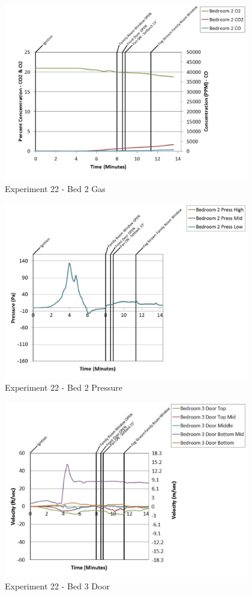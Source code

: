 \documentclass{article}
\begin{document}
\begin{appendices}
	\begin{figure}[h!]
		\centering
		\includegraphics[height=3.05in]{0_Images/Results_Charts/Exp_22_Charts/Bed2Gas.pdf}
		\caption{Experiment 22 - Bed 2 Gas}
	\end{figure}
 
	\clearpage

	\begin{figure}[h!]
		\centering
		\includegraphics[height=3.05in]{0_Images/Results_Charts/Exp_22_Charts/Bed2Pressure.pdf}
		\caption{Experiment 22 - Bed 2 Pressure}
	\end{figure}
 

	\begin{figure}[h!]
		\centering
		\includegraphics[height=3.05in]{0_Images/Results_Charts/Exp_22_Charts/Bed3Door.pdf}
		\caption{Experiment 22 - Bed 3 Door}
	\end{figure}
 

\end{appendices}
\end{document}
